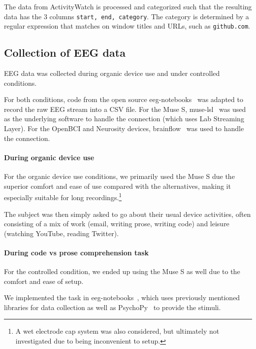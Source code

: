         The data from ActivityWatch is processed and categorized such that the resulting data has the 3 columns \texttt{start, end, category}. The category is determined by a regular expression that matches on window titles and URLs, such as \texttt{github.com}.

    \subsection{Collection of EEG data}

        EEG data was collected during organic device use and under controlled conditions.

        For both conditions, code from the open source eeg-notebooks~\cite{barachant_eeg-notebooks_2020} was adapted to record the raw EEG stream into a CSV file. For the Muse S, muse-lsl~\cite{muse-lsl} was used as the underlying software to handle the connection (which uses Lab Streaming Layer). For the OpenBCI and Neurosity devices, brainflow~\cite{noauthor_brainflow_2020} was used to handle the connection.

        \paragraph{During organic device use}

            For the organic device use conditions, we primarily used the Muse S due the superior comfort and ease of use compared with the alternatives, making it especially suitable for long recordings.\footnote{A wet electrode cap system was also considered, but ultimately not investigated due to being inconvenient to setup.}

            The subject was then simply asked to go about their usual device activities, often consisting of a mix of work (email, writing prose, writing code) and leisure (watching YouTube, reading Twitter).

        \paragraph{During code vs prose comprehension task}

            For the controlled condition, we ended up using the Muse S as well due to the comfort and ease of setup.

            We implemented the task in eeg-notebooks~\cite{barachant_eeg-notebooks_2020}, which uses previously mentioned libraries for data collection as well as PsychoPy~\cite{peirce_psychopy2_2019} to provide the stimuli.

